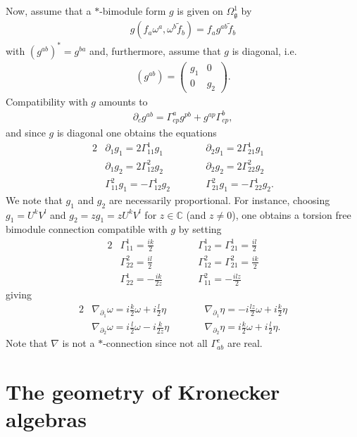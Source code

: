 \documentclass{amsart}
\newcommand{\complex}{\mathbb{C}}
\theoremstyle{definition}
\theoremstyle{remark}
\numberwithin{equation}{section}
\renewcommand{\d}{\partial}
\newcommand{\g}{\mathfrak{g}}
\newcommand{\Omegaoneg}{\Omega^1_{\g}}
\begin{document}
Now, assume that a $\ast$-bimodule form $g$ is given on
$\Omegaoneg$ by
\begin{align*}
  g(f_a\omega^a,\omega^b\tilde{f}_b) = f_ag^{ab}\tilde{f}_b
\end{align*}
with $(g^{ab})^\ast=g^{ba}$ and, furthermore, assume that $g$ is
diagonal, i.e.
\begin{align*}
  (g^{ab}) =
  \begin{pmatrix}
    g_1 & 0 \\ 0 & g_2
  \end{pmatrix}.
\end{align*}
Compatibility with $g$ amounts to 
\begin{align*}
  \d_cg^{ab} = \Gamma^a_{cp}g^{pb} + g^{ap}\Gamma^b_{cp},
\end{align*}
and since $g$ is diagonal one obtains the equations
\begin{alignat*}{2}
  &\d_1g_1 = 2\Gamma^1_{11}g_1 &\qquad
  &\d_2g_1 = 2\Gamma^1_{21}g_1\\
  &\d_1g_2 = 2\Gamma^2_{12}g_2 &
  &\d_2g_2 = 2\Gamma^2_{22}g_2\\
  &\Gamma^2_{11}g_1 = -\Gamma^1_{12}g_2 &
  &\Gamma^2_{21} g_1 = -\Gamma^1_{22}g_2.
\end{alignat*}
We note that $g_1$ and $g_2$ are necessarily proportional. For
instance, choosing $g_1=U^kV^l$ and $g_2=zg_1=zU^kV^l$ for
$z\in\complex$ (and $z\neq 0$), one obtains a torsion free bimodule
connection compatible with $g$ by setting
\begin{alignat*}{2}
  &\Gamma^1_{11} = \tfrac{ik}{2} &\qquad
  &\Gamma^1_{12}=\Gamma^1_{21} = \tfrac{il}{2}\\
  &\Gamma^2_{22} = \tfrac{il}{2} &
  &\Gamma^2_{12}=\Gamma^2_{21}=\tfrac{ik}{2}\\
  &\Gamma^1_{22} = -\tfrac{ik}{2z}&
  &\Gamma^2_{11} = -\tfrac{ilz}{2}
\end{alignat*}
giving
\begin{alignat*}{2}
  &\nabla_{\d_1}\omega = i\tfrac{k}{2}\omega + i\tfrac{l}{2}\eta&\qquad
  &\nabla_{\d_1}\eta =  -i\tfrac{lz}{2}\omega + i\tfrac{k}{2}\eta  \\
  &\nabla_{\d_2}\omega = i\tfrac{l}{2}\omega - i\tfrac{k}{2z}\eta  &
  &\nabla_{\d_2}\eta = i\tfrac{k}{2}\omega + i\tfrac{l}{2}\eta.
\end{alignat*}
Note that $\nabla$ is not a $\ast$-connection since not all $\Gamma^c_{ab}$ are real.

\section{The geometry of Kronecker algebras}\label{sec:kronecker.alg}
\end{document}
